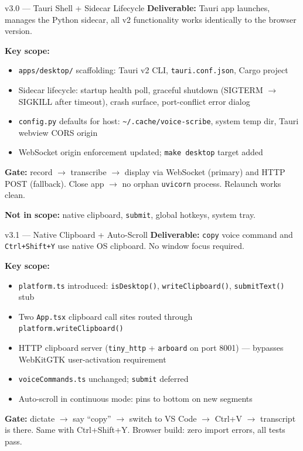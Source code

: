 \documentclass{beamer}
\begin{document}
\begin{frame}{v3.0 --- Tauri Shell + Sidecar Lifecycle}
    \small
    \textbf{Deliverable:} Tauri app launches, manages the Python sidecar, all v2
    functionality works identically to the browser version.

    \vspace{0.2em}
    \textbf{Key scope:}
    \begin{itemize}\setlength{\itemsep}{0pt}
        \item \texttt{apps/desktop/} scaffolding: Tauri v2 CLI, \texttt{tauri.conf.json},
              Cargo project
        \item Sidecar lifecycle: startup health poll, graceful shutdown (SIGTERM $\to$
              SIGKILL after timeout), crash surface, port-conflict error dialog
        \item \texttt{config.py} defaults for host: \texttt{\textasciitilde/.cache/voice-scribe},
              system temp dir, Tauri webview CORS origin
        \item WebSocket origin enforcement updated; \texttt{make desktop} target added
    \end{itemize}

    \vspace{0.2em}
    \textbf{Gate:} record $\to$ transcribe $\to$ display via WebSocket (primary) and
    HTTP POST (fallback). Close app $\to$ no orphan \texttt{uvicorn} process.
    Relaunch works clean.

    \textbf{Not in scope:} native clipboard, \texttt{submit}, global hotkeys, system tray.
\end{frame}


\begin{frame}{v3.1 --- Native Clipboard + Auto-Scroll}
    \small
    \textbf{Deliverable:} \texttt{copy} voice command and \texttt{Ctrl+Shift+Y} use native
    OS clipboard. No window focus required.

    \vspace{0.15em}
    \textbf{Key scope:}
    \begin{itemize}\setlength{\itemsep}{0pt}
        \item \texttt{platform.ts} introduced: \texttt{isDesktop()},
              \texttt{writeClipboard()}, \texttt{submitText()} stub
        \item Two \texttt{App.tsx} clipboard call sites routed through
              \texttt{platform.writeClipboard()}
        \item HTTP clipboard server (\texttt{tiny\_http} + \texttt{arboard}
              on port 8001) --- bypasses WebKitGTK user-activation requirement
        \item \texttt{voiceCommands.ts} unchanged; \texttt{submit} deferred
        \item Auto-scroll in continuous mode: pins to bottom on new segments
    \end{itemize}

    \vspace{0.1em}
    \textbf{Gate:} dictate $\to$ say ``copy'' $\to$ switch to VS Code $\to$ Ctrl+V $\to$
    transcript is there. Same with Ctrl+Shift+Y. Browser build: zero import errors,
    all tests pass.
\end{frame}
\end{document}
